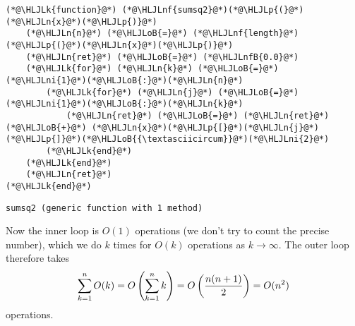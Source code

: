 \begin{lstlisting}
(*@\HLJLk{function}@*) (*@\HLJLnf{sumsq2}@*)(*@\HLJLp{(}@*)(*@\HLJLn{x}@*)(*@\HLJLp{)}@*)
    (*@\HLJLn{n}@*) (*@\HLJLoB{=}@*) (*@\HLJLnf{length}@*)(*@\HLJLp{(}@*)(*@\HLJLn{x}@*)(*@\HLJLp{)}@*)
    (*@\HLJLn{ret}@*) (*@\HLJLoB{=}@*) (*@\HLJLnfB{0.0}@*)
    (*@\HLJLk{for}@*) (*@\HLJLn{k}@*) (*@\HLJLoB{=}@*) (*@\HLJLni{1}@*)(*@\HLJLoB{:}@*)(*@\HLJLn{n}@*)
        (*@\HLJLk{for}@*) (*@\HLJLn{j}@*) (*@\HLJLoB{=}@*) (*@\HLJLni{1}@*)(*@\HLJLoB{:}@*)(*@\HLJLn{k}@*)
            (*@\HLJLn{ret}@*) (*@\HLJLoB{=}@*) (*@\HLJLn{ret}@*) (*@\HLJLoB{+}@*) (*@\HLJLn{x}@*)(*@\HLJLp{[}@*)(*@\HLJLn{j}@*)(*@\HLJLp{]}@*)(*@\HLJLoB{{\textasciicircum}}@*)(*@\HLJLni{2}@*)
        (*@\HLJLk{end}@*)
    (*@\HLJLk{end}@*)
    (*@\HLJLn{ret}@*)
(*@\HLJLk{end}@*)
\end{lstlisting}

\begin{lstlisting}
sumsq2 (generic function with 1 method)
\end{lstlisting}


Now the inner loop is $O(1)$ operations (we don't try to count the precise number), which we do $k$ times for $O(k)$ operations as $k \ensuremath{\rightarrow} \ensuremath{\infty}$. The outer loop therefore takes
\[
\ensuremath{\sum}_{k = 1}^n O(k) = O\left(\ensuremath{\sum}_{k = 1}^n k\right) = O\left( {n (n+1) \over 2} \right) = O(n^2)
\]
operations.



